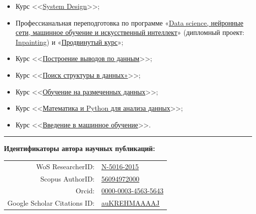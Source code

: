 \documentclass[11pt]{article}
\begin{document}
	\begin{itemize}
		\item Курс <<\href{https://lab.karpov.courses/certificate/752f8aad-7f6e-40ad-98c2-12efe12bc0b7/}{System Design}>>;
		\item Профессианальная переподготовка по программе «\href{https://disk.yandex.ru/i/H5-s3Lw6j-1wkg}{Data science, нейронные сети, машинное обучение и искусственный интеллект}» (дипломный проект: \href{https://github.com/NikitaShubin/Inpainting}{Inpainting}) \cite{inpainting} и «\href{https://disk.yandex.ru/i/t3yNB56C3nNo5A}{Продвинутый курс}»;
		\item Курс <<\href{https://www.coursera.org/account/accomplishments/certificate/DMUZAUCWBQG4}{Построение выводов по данным}>>;
		\item Курс <<\href{https://www.coursera.org/account/accomplishments/certificate/H8BWKAK4Y96D}{Поиск структуры в данных»}>>;
		\item Курс <<\href{https://www.coursera.org/account/accomplishments/certificate/9GQC5C4UP9YB}{Обучение на размеченных данных}>>;
		\item Курс <<\href{https://www.coursera.org/account/accomplishments/certificate/2AZHZW96L%J2N}{Математика и Python для анализа данных}>>;
		\item Курс <<\href{https://www.coursera.org/account/accomplishments/certificate/6K5Z2UFA5887}{Введение в машинное обучение}>>.
	\end{itemize}
	\vspace{1em}
	\hrule
	\vspace{1em}
	\noindent\hypertarget{AutorIDs}{\textbf{Идентификаторы автора научных публикаций:}}
	\vspace{0.5em}
	\begin{longtable} {r | l}
		WoS ResearcherID: & \href{https://publons.com/researcher/2345963/nikita-y-shubin/}{\underline{N-5016-2015}}\\
		Scopus AuthorID: & \href{https://www.scopus.com/authid/detail.uri?authorId=56094972000}{\underline{56094972000}}\\
		Orcid: & \href{https://orcid.org/0000-0003-4563-5643}{\underline{0000-0003-4563-5643}}\\
		Google Scholar Citations ID: & \href{https://scholar.google.com/citations?user=auKREHMAAAAJ}{\underline{auKREHMAAAAJ}}
	\end{longtable}
    
	
	
\end{document}
